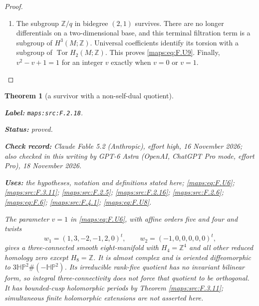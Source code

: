 \documentclass[11pt,a4paper]{article}
\newtheorem{theorem}{Theorem}[section]
\theoremstyle{definition}
\newcommand{\StatementRecord}[4]{\par\smallskip\begingroup\upshape\raggedright\noindent\textbf{Label:} \nolinkurl{#1}.\par\noindent\textbf{Status:} #2.\par\noindent\textbf{Check record:} #3.\par\noindent\textbf{Uses:} #4.\par\endgroup\smallskip}
\newcommand{\CurrentChecker}{GPT-6 Astra (OpenAI, ChatGPT Pro mode, effort Pro), 18 November 2026}
\begin{document}
\begin{proof}
\begin{enumerate}[label=\arabic*.]
\item The subgroup $\mathbb Z/q$ in bidegree $(2,1)$ survives.
There are no longer differentials on a two-dimensional base,
and this terminal filtration term is a subgroup of
$H^3(M;\mathbb Z)$.  Universal coefficients identify its
torsion with a subgroup of $\operatorname{Tor}H_2(M;\mathbb Z)$.
This proves \eqref{maps:eq:F.U9}.  Finally, $v^2-v+1=1$ for an integer $v$
exactly when $v=0$ or $v=1$.

\end{enumerate}
\end{proof}




\begin{theorem}[a survivor with a non-self-dual quotient]\label{maps:src:F.2.18}
\StatementRecord{maps:src:F.2.18}{proved}{Claude Fable 5.2 (Anthropic), effort high, 16 November 2026; also checked in this writing by \CurrentChecker}{the hypotheses, notation and definitions stated here; \cref{maps:eq:F.U6}; \cref{maps:src:F.3.11}; \cref{maps:src:F.2.5}; \cref{maps:src:F.2.16}; \cref{maps:src:F.2.6}; \cref{maps:eq:F.6}; \cref{maps:src:F.4.1}; \cref{maps:eq:F.U8}}


The parameter $v=1$ in \eqref{maps:eq:F.U6}, with affine orders five and four
and twists
\[
 w_1=(1,3,-2,-1,2,0)^t,\qquad
 w_2=(-1,0,0,0,0,0)^t,
\]
gives a three-connected smooth eight-manifold with
$H_4=\mathbb Z^4$ and all other reduced homology zero except
$H_8=\mathbb Z$.  It is almost complex and is oriented
diffeomorphic to $3\mathbb{HP}^2\#(-\mathbb{HP}^2)$.
Its irreducible rank-five quotient has no invariant bilinear
form, so integral three-connectivity does not force that
quotient to be orthogonal.  It has bounded-cusp holomorphic
periods by Theorem \ref{maps:src:F.3.11}; simultaneous finite holomorphic
extensions are not asserted here.

\end{theorem}
\end{document}
